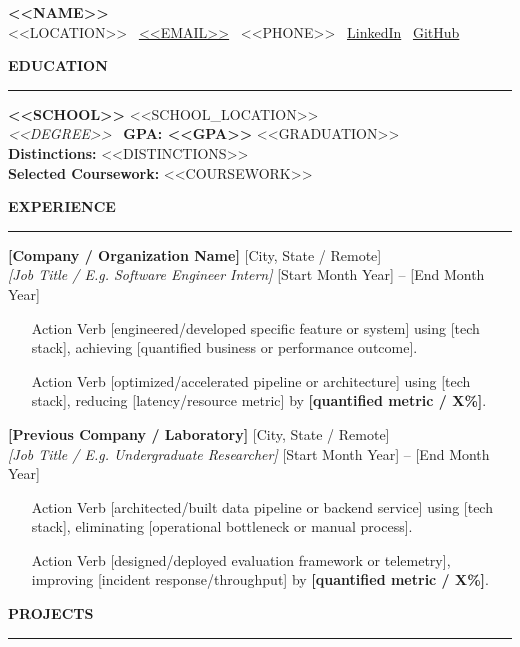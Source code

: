 \documentclass[10pt,letterpaper]{article}
\newcommand{\cvsection}[1]{%
  \vspace{3.5pt}%
  {\small\textbf{\MakeUppercase{#1}}}\\[-3.5pt]%
  \rule{\textwidth}{0.4pt}\par\vspace{2pt}%
}
\begin{document}
\begin{center}
    {\LARGE \textbf{<<NAME>>}}\\[2pt]
    \small <<LOCATION>> \textbullet\ \href{mailto:<<EMAIL>>}{<<EMAIL>>} \textbullet\ <<PHONE>> \textbullet\ \href{<<LINKEDIN>>}{LinkedIn} \textbullet\ \href{<<GITHUB>>}{GitHub}
\end{center}
\vspace{-6pt}

\cvsection{Education}
\textbf{<<SCHOOL>>} \hfill <<SCHOOL_LOCATION>>\\
\textit{<<DEGREE>>} \textbullet\ \textbf{GPA: <<GPA>>} \hfill <<GRADUATION>>\\
\textbf{Distinctions:} <<DISTINCTIONS>>\\
\textbf{Selected Coursework:} <<COURSEWORK>>

\cvsection{Experience}

\textbf{[Company / Organization Name]} \hfill [City, State / Remote]\\
\textit{[Job Title / E.g. Software Engineer Intern]} \hfill [Start Month Year] -- [End Month Year]
\begin{itemize}
    \item [Action Verb] [engineered/developed specific feature or system] using [tech stack], achieving [quantified business or performance outcome].
    \item [Action Verb] [optimized/accelerated pipeline or architecture] using [tech stack], reducing [latency/resource metric] by \textbf{[quantified metric / X\%]}.
\end{itemize}

\vspace{2pt}
\textbf{[Previous Company / Laboratory]} \hfill [City, State / Remote]\\
\textit{[Job Title / E.g. Undergraduate Researcher]} \hfill [Start Month Year] -- [End Month Year]
\begin{itemize}
    \item [Action Verb] [architected/built data pipeline or backend service] using [tech stack], eliminating [operational bottleneck or manual process].
    \item [Action Verb] [designed/deployed evaluation framework or telemetry], improving [incident response/throughput] by \textbf{[quantified metric / X\%]}.
\end{itemize}

\cvsection{Projects}
\end{document}
